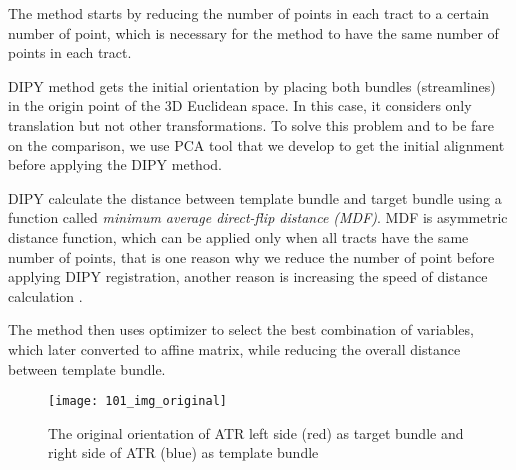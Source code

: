 \documentclass[../structure.tex]{subfiles}
\begin{document}
The method starts by reducing the number of points in each tract to a certain number of point, which is necessary for the method to have the same number of points in each tract.

DIPY method gets the initial orientation by placing both bundles (streamlines) in the origin point of the 3D Euclidean space. In this case, it considers only translation but not other transformations. To solve this problem and to be fare on the comparison, we use PCA tool that we develop to get the initial alignment before applying the DIPY method.

DIPY calculate the distance between template bundle and target bundle using a function called \textit{minimum average direct-flip distance (MDF)}. MDF is asymmetric
distance function, which can be applied only when all tracts have the same number of points, that is one reason why we reduce the number of point before applying DIPY registration, another reason is increasing the speed of distance calculation \cite{Garyfallidis2012}.

The method then uses optimizer to select the best combination of variables, which later converted to affine matrix, while reducing the overall distance between template bundle.

\begin{comment}
\section{Testing steps}
\begin{itemize}
\item Read bundles from \textit{ply} files
\item Apply PCA and visually inspect the alignment result
\item If the visual inspection was positive and PCA improved the alignment, we consider its result, otherwise we just flip the template bundle or consider the original orientation
\item Generate distances histogram between two bundles to select the distance threshold
\item Start the registration and iterate until there is no more improvement on the alignment
\end{itemize}
\end{comment}

\begin{figure}[H]
\centering
\texttt{[image: 101\_img\_original]}
\captionsetup{justification=centering}
\caption{The original orientation of ATR left side (red) as target bundle and right side of ATR (blue) as template bundle}
\label{fig:img_original}
\end{figure}
\end{document}
